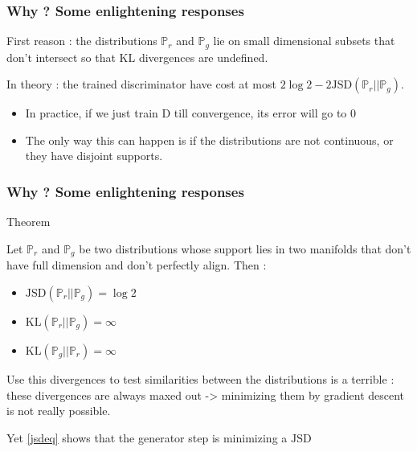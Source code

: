 \documentclass[french,9pt]{beamer}
\begin{document}
\begin{frame}
\frametitle{Why ? Some enlightening responses \cite{arjovsky_towards_2017}}

First reason : the distributions $\mathbb{P}_{r}$ and $\mathbb{P}_{g}$ lie on small dimensional subsets that don't intersect so that $\text{KL}$ divergences are undefined.

\pause

In theory : the trained discriminator have cost at most $2 \log 2 - 2 \text{JSD}(\mathbb{P}_{r}||\mathbb{P}_{g})$.
\begin{itemize}
\item  In practice, if we just train D till convergence, its error will go to 0
\item The only way this can happen is if the distributions are not continuous, or they have disjoint supports.
\end{itemize}


\end{frame}



\begin{frame}
\frametitle{Why ? Some enlightening responses \cite{arjovsky_towards_2017}}



\begin{block}{Theorem}

Let $\mathbb{P}_{r}$ and $\mathbb{P}_{g}$ be two distributions whose support lies in two manifolds that don’t have full dimension and don’t perfectly align. Then :
\begin{itemize}
\item $\text{JSD}(\mathbb{P}_{r}||\mathbb{P}_{g})=\log 2$
\item $\text{KL}(\mathbb{P}_{r}||\mathbb{P}_{g})=\infty$
\item $\text{KL}(\mathbb{P}_{g}||\mathbb{P}_{r})=\infty$
\end{itemize}
\end{block}

\pause

Use this divergences to test similarities between the distributions is a terrible : these divergences are always maxed out -> minimizing them by gradient descent is not really possible. 

Yet \eqref{jsdeq} shows that the generator step is minimizing a $\text{JSD}$

\end{frame}
\end{document}
